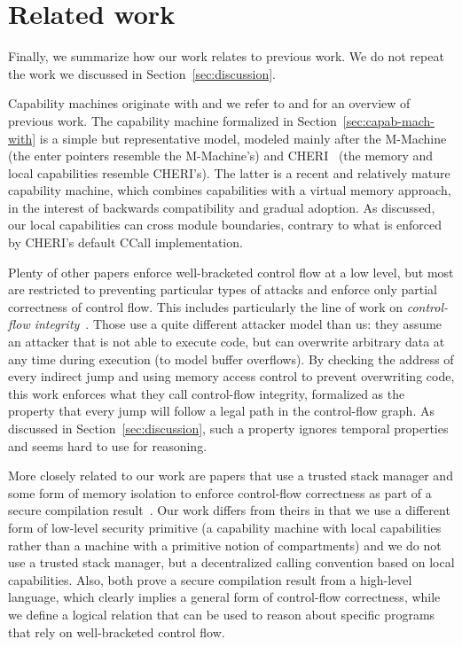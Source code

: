 \documentclass[compsoc,conference,letterpaper,fleqn]{IEEEtran}
\newcommand\lau[1]{{\color{purple} \sf \footnotesize {LS: #1}}\\}
\renewcommand\lau[1]{}
\begin{document}
\section{Related work}
\label{sec:related-work}

Finally, we summarize how our work relates to previous work. We do not
repeat the work we discussed in Section~\ref{sec:discussion}.

Capability machines originate with \citet{Dennis:1966:PSM:365230.365252} and we refer to
\citet{Levy1984capability} and \citet{Watson2015Cheri} for an overview
of previous work. The capability machine formalized in
Section~\ref{sec:capab-mach-with} is a simple but representative
model, modeled mainly after the
M-Machine~\citep{Carter:1994:HSF:195473.195579} (the enter pointers
resemble the M-Machine's) and
CHERI~\citep{Watson2015Cheri,Woodruff:2014:CCM:2665671.2665740} (the
memory and local capabilities resemble CHERI's). The latter is a
recent and relatively mature capability machine, which combines
capabilities with a virtual memory approach, in the interest of
backwards compatibility and gradual adoption. As discussed, our local
capabilities can cross module boundaries, 
contrary to what is enforced by CHERI's default CCall implementation.

Plenty of other papers\lau{If there are plenty, then I guess we should cite more
  than one?} enforce well-bracketed control flow at a low level, but most are
restricted to preventing particular types of attacks and enforce only partial
correctness of control flow. This includes particularly the line of work on
\emph{control-flow integrity}~\citep{abadi_control-flow_2005}. Those use a quite
different attacker model than us: they assume an attacker that is not able to
execute code, but can overwrite arbitrary data at any time during execution (to
model buffer overflows). By checking the address of every indirect jump and
using memory access control to prevent overwriting code, this work enforces what
they call control-flow integrity, formalized as the property that every jump
will follow a legal path in the control-flow graph. As discussed in
Section~\ref{sec:discussion}, such a property ignores temporal properties and
seems hard to use for reasoning.

More closely related to our work are papers that use a trusted stack manager and
some form of memory isolation to enforce control-flow correctness as part of a
secure compilation
result~\citep{patrignani_modular_2016-1,juglaret_beyond_2016-1}. Our work
differs from theirs in that we use a different form of low-level security
primitive (a capability machine with local capabilities rather than a machine
with a primitive notion of compartments) and we do not use a trusted stack
manager, but a decentralized calling convention based on local
capabilities. Also, both prove a secure compilation result from a high-level
language, which clearly implies a general form of control-flow correctness,
while we define a logical relation that can be used to reason about
specific programs that rely on well-bracketed control flow.
\end{document}
